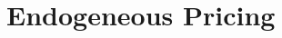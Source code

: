\documentclass[10pt]{article}
\begin{document}
\newpage
\section{Endogeneous Pricing}


\end{document}
